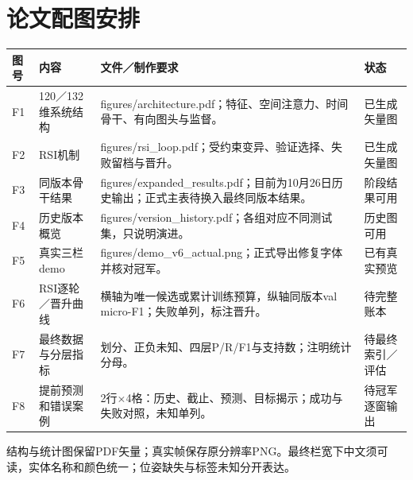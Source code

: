 \documentclass[11pt,a4paper]{ctexart}
\begin{document}
\section{论文配图安排}
\begin{longtable}{L{.8cm}L{3.3cm}L{7.2cm}L{2.7cm}}
\toprule 图号 & 内容 & 文件／制作要求 & 状态\\\midrule\endhead
F1 & 120／132维系统结构 & figures/architecture.pdf；特征、空间注意力、时间骨干、有向图头与监督。 & 已生成矢量图\\
F2 & RSI机制 & figures/rsi\_loop.pdf；受约束变异、验证选择、失败留档与晋升。 & 已生成矢量图\\
F3 & 同版本骨干结果 & figures/expanded\_results.pdf；目前为10月26日历史输出；正式主表待换入最终同版本结果。 & 阶段结果可用\\
F4 & 历史版本概览 & figures/version\_history.pdf；各组对应不同测试集，只说明演进。 & 历史图可用\\
F5 & 真实三栏demo & figures/demo\_v6\_actual.png；正式导出修复字体并核对冠军。 & 已有真实预览\\
F6 & RSI逐轮／晋升曲线 & 横轴为唯一候选或累计训练预算，纵轴同版本val micro-F1；失败单列，标注晋升。 & 待完整账本\\
F7 & 最终数据与分层指标 & 划分、正负未知、四层P/R/F1与支持数；注明统计分母。 & 待最终索引／评估\\
F8 & 提前预测和错误案例 & 2行$\times$4格：历史、截止、预测、目标揭示；成功与失败对照，未知单列。 & 待冠军逐窗输出\\\bottomrule
\end{longtable}
结构与统计图保留PDF矢量；真实帧保存原分辨率PNG。最终栏宽下中文须可读，实体名称和颜色统一；位姿缺失与标签未知分开表达。
\end{document}
